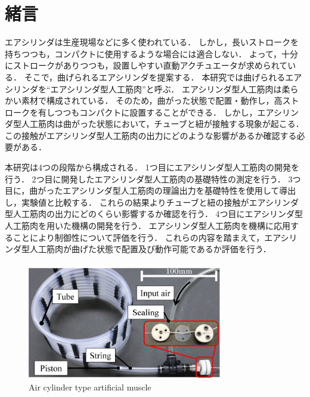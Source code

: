 \section{緒言}%
エアシリンダは生産現場などに多く使われている．
しかし，長いストロークを持ちつつも，コンパクトに使用するような場合には適合しない．
よって，十分にストロークがありつつも，設置しやすい直動アクチュエータが求められている．
そこで，曲げられるエアシリンダを提案する．
本研究では曲げられるエアシリンダを``エアシリンダ型人工筋肉''と呼ぶ．
エアシリンダ型人工筋肉は柔らかい素材で構成されている．
そのため，曲がった状態で配置・動作し，高ストロークを有しつつもコンパクトに設置することができる．
しかし，エアシリンダ型人工筋肉は曲がった状態において，チューブと紐が接触する現象が起こる．
この接触がエアシリンダ型人工筋肉の出力にどのような影響があるか確認する必要がある．
\par
本研究は4つの段階から構成される．
1つ目にエアシリンダ型人工筋肉の開発を行う．
2つ目に開発したエアシリンダ型人工筋肉の基礎特性の測定を行う．
3つ目に，曲がったエアシリンダ型人工筋肉の理論出力を基礎特性を使用して導出し，実験値と比較する．
これらの結果よりチューブと紐の接触がエアシリンダ型人工筋肉の出力にどのくらい影響するか確認を行う．
4つ目にエアシリンダ型人工筋肉を用いた機構の開発を行う．
エアシリンダ型人工筋肉を機構に応用することにより制御性について評価を行う．
これらの内容を踏まえて，エアシリンダ型人工筋肉が曲げた状態で配置及び動作可能であるか評価を行う．

\begin{figure}[t]
  \centering
  \includegraphics[width=85mm]{_pdf/細径柔軟エアシリンダ-１本.pdf}
  \caption{Air cylinder type artificial muscle}
  \label{Air cylinder type artificial muscle}
\end{figure}

